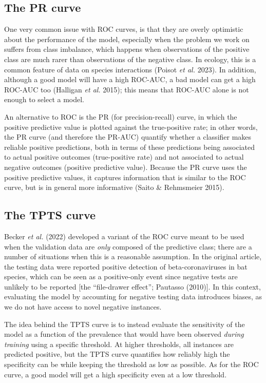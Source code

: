 \documentclass[
  letterpaper,
]{scrbook}
\begin{document}
\subsection{The PR curve}\label{the-pr-curve}

One very common issue with ROC curves, is that they are overly
optimistic about the performance of the model, especially when the
problem we work on suffers from class imbalance, which happens when
observations of the positive class are much rarer than observations of
the negative class. In ecology, this is a common feature of data on
species interactions (Poisot \emph{et al.} 2023). In addition, although
a good model will have a high ROC-AUC, a bad model can get a high
ROC-AUC too (Halligan \emph{et al.} 2015); this means that ROC-AUC alone
is not enough to select a model.

An alternative to ROC is the PR (for precision-recall) curve, in which
the positive predictive value is plotted against the true-positive rate;
in other words, the PR curve (and therefore the PR-AUC) quantify whether
a classifier makes reliable positive predictions, both in terms of these
predictions being associated to actual positive outcomes (true-positive
rate) and not associated to actual negative outcomes (positive
predictive value). Because the PR curve uses the positive predictive
values, it captures information that is similar to the ROC curve, but is
in general more informative (Saito \& Rehmsmeier 2015).

\subsection{The TPTS curve}\label{the-tpts-curve}

Becker \emph{et al.} (2022) developed a variant of the ROC curve meant
to be used when the validation data are \emph{only} composed of the
predictive class; there are a number of situations when this is a
reasonable assumption. In the original article, the testing data were
reported positive detection of beta-coronaviruses in bat species, which
can be seen as a positive-only event since negative tests are unlikely
to be reported {[}the ``file-drawer effect''; Pautasso (2010){]}. In
this context, evaluating the model by accounting for negative testing
data introduces biases, as we do not have access to novel negative
instances.

The idea behind the TPTS curve is to instead evaluate the sensitivity of
the model as a function of the prevalence that would have been observed
\emph{during training} using a specific threshold. At higher thresholds,
all instances are predicted positive, but the TPTS curve quantifies how
reliably high the specificity can be while keeping the threshold as low
as possible. As for the ROC curve, a good model will get a high
specificity even at a low threshold.
\end{document}
